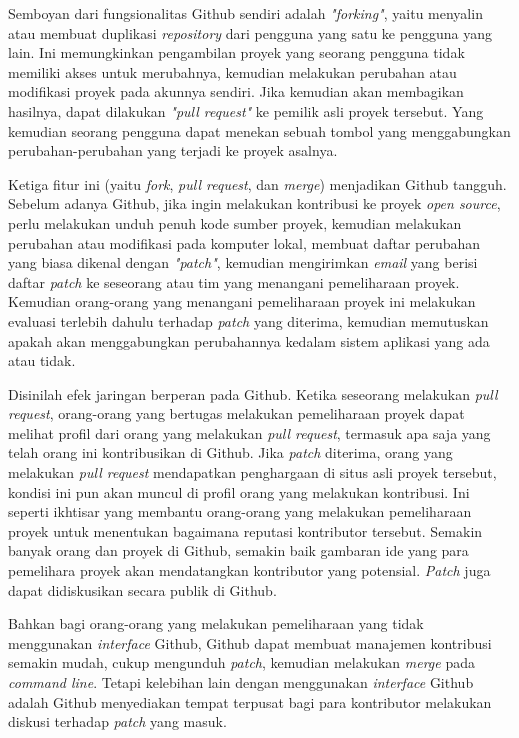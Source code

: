 \documentclass[pdftex,12pt, oneside]{article}
\begin{document}
Semboyan dari fungsionalitas Github sendiri adalah \textit{"forking"}, yaitu menyalin atau membuat duplikasi \textit{repository} dari pengguna yang satu ke pengguna yang lain. Ini memungkinkan pengambilan proyek yang seorang pengguna tidak memiliki akses untuk merubahnya, kemudian melakukan perubahan atau modifikasi proyek pada akunnya sendiri. Jika kemudian akan membagikan hasilnya, dapat dilakukan \textit{"pull request"} ke pemilik asli proyek tersebut. Yang kemudian seorang pengguna dapat menekan sebuah tombol yang menggabungkan perubahan-perubahan yang terjadi ke proyek asalnya.

Ketiga fitur ini (yaitu \textit{fork}, \textit{pull request}, dan \textit{merge}) menjadikan Github tangguh. Sebelum adanya Github, jika ingin melakukan kontribusi ke proyek \textit{open source}, perlu melakukan unduh penuh kode sumber proyek, kemudian melakukan perubahan atau modifikasi pada komputer lokal, membuat daftar perubahan yang biasa dikenal dengan \textit{"patch"}, kemudian mengirimkan \textit{email} yang berisi daftar \textit{patch} ke seseorang atau tim yang menangani pemeliharaan proyek. Kemudian orang-orang yang menangani pemeliharaan proyek ini melakukan evaluasi terlebih dahulu terhadap \textit{patch} yang diterima, kemudian memutuskan apakah akan menggabungkan perubahannya kedalam sistem aplikasi yang ada atau tidak.

Disinilah efek jaringan berperan pada Github. Ketika seseorang melakukan \textit{pull request}, orang-orang yang bertugas melakukan pemeliharaan proyek dapat melihat profil dari orang yang melakukan \textit{pull request}, termasuk apa saja yang telah orang ini kontribusikan di Github. Jika \textit{patch} diterima, orang yang melakukan \textit{pull request} mendapatkan penghargaan di situs asli proyek tersebut, kondisi ini pun akan muncul di profil orang yang melakukan kontribusi. Ini seperti ikhtisar yang membantu orang-orang yang melakukan pemeliharaan proyek untuk menentukan bagaimana reputasi kontributor tersebut. Semakin banyak orang dan proyek di Github, semakin baik gambaran ide yang para pemelihara proyek akan mendatangkan kontributor yang potensial. \textit{Patch} juga dapat didiskusikan secara publik di Github.

Bahkan bagi orang-orang yang melakukan pemeliharaan yang tidak menggunakan \textit{interface} Github, Github dapat membuat manajemen kontribusi semakin mudah, cukup mengunduh \textit{patch}, kemudian melakukan \textit{merge} pada \textit{command line}. Tetapi kelebihan lain dengan menggunakan \textit{interface} Github adalah Github menyediakan tempat terpusat bagi para kontributor melakukan diskusi terhadap \textit{patch} yang masuk.
\end{document}
